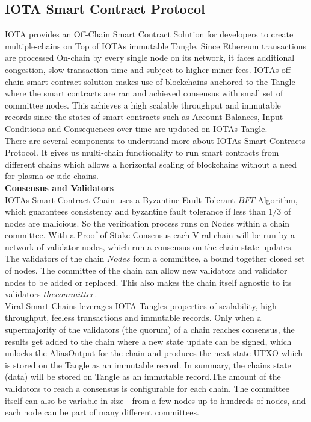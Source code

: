 \documentclass[10pt]{article}
\begin{document}
\subsection{IOTA Smart Contract Protocol}

IOTA provides an Off-Chain Smart Contract Solution for developers to create multiple-chains on Top of IOTA\textsc{}s immutable Tangle. Since Ethereum transactions are processed On-chain by every single node on its network, it faces additional congestion, slow transaction time and subject to higher miner fees. IOTA\textsc{}s off-chain smart contract solution makes use of blockchains anchored to the Tangle where the smart contracts are ran and achieved consensus with small set of committee nodes. This achieves a high scalable throughput and immutable records since the states of smart contracts such as Account Balances, Input Conditions and Consequences over time are updated on IOTA\textsc{}s Tangle.\\

There are several components to understand more about IOTA\textsc{}s Smart Contracts Protocol. It gives us multi-chain functionality to run smart contracts from different chains which allows a horizontal scaling of blockchains without a need for plasma or side chains.\\

\textbf{Consensus and Validators}\\

IOTA\textsc{}s Smart Contract Chain uses a Byzantine Fault Tolerant \(BFT\) Algorithm, which guarantees consistency and byzantine fault tolerance if less than $1/3$ of nodes are malicious. So the verification process runs on Nodes within a chain committee. With a Proof-of-Stake Consensus each Viral chain will be run by a network of validator nodes, which run a consensus on the chain state updates. The validators of the chain \(Nodes\) form a committee, a bound together closed set of nodes. The committee of the chain can allow new validators and validator nodes to be added or replaced. This also makes the chain itself agnostic to its validators \(the committee\).\\

Viral Smart Chains leverages IOTA Tangle\textsc{}s properties of scalability, high throughput, feeless transactions and immutable records. Only when a supermajority of the validators (the quorum) of a chain reaches consensus, the results get added to the chain where a new state update can be signed, which unlocks the AliasOutput for the chain and produces the next state UTXO which is stored on the Tangle as an immutable record. In summary, the chain\textsc{}s state (data) will be stored on Tangle as an immutable record.The amount of the validators to reach a consensus is configurable for each chain. The committee itself can also be variable in size - from a few nodes up to hundreds of nodes, and each node can be part of many different committees.
\end{document}
